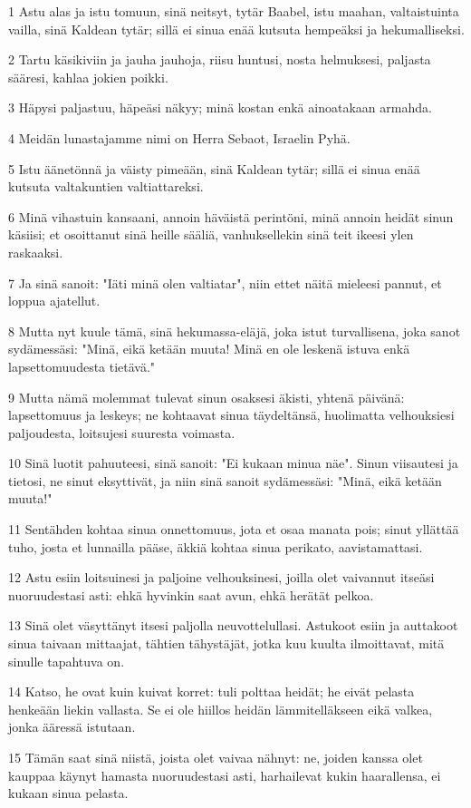 \par 1 Astu alas ja istu tomuun, sinä neitsyt, tytär Baabel, istu maahan, valtaistuinta vailla, sinä Kaldean tytär; sillä ei sinua enää kutsuta hempeäksi ja hekumalliseksi.
\par 2 Tartu käsikiviin ja jauha jauhoja, riisu huntusi, nosta helmuksesi, paljasta sääresi, kahlaa jokien poikki.
\par 3 Häpysi paljastuu, häpeäsi näkyy; minä kostan enkä ainoatakaan armahda.
\par 4 Meidän lunastajamme nimi on Herra Sebaot, Israelin Pyhä.
\par 5 Istu äänetönnä ja väisty pimeään, sinä Kaldean tytär; sillä ei sinua enää kutsuta valtakuntien valtiattareksi.
\par 6 Minä vihastuin kansaani, annoin häväistä perintöni, minä annoin heidät sinun käsiisi; et osoittanut sinä heille sääliä, vanhuksellekin sinä teit ikeesi ylen raskaaksi.
\par 7 Ja sinä sanoit: "Iäti minä olen valtiatar", niin ettet näitä mieleesi pannut, et loppua ajatellut.
\par 8 Mutta nyt kuule tämä, sinä hekumassa-eläjä, joka istut turvallisena, joka sanot sydämessäsi: "Minä, eikä ketään muuta! Minä en ole leskenä istuva enkä lapsettomuudesta tietävä."
\par 9 Mutta nämä molemmat tulevat sinun osaksesi äkisti, yhtenä päivänä: lapsettomuus ja leskeys; ne kohtaavat sinua täydeltänsä, huolimatta velhouksiesi paljoudesta, loitsujesi suuresta voimasta.
\par 10 Sinä luotit pahuuteesi, sinä sanoit: "Ei kukaan minua näe". Sinun viisautesi ja tietosi, ne sinut eksyttivät, ja niin sinä sanoit sydämessäsi: "Minä, eikä ketään muuta!"
\par 11 Sentähden kohtaa sinua onnettomuus, jota et osaa manata pois; sinut yllättää tuho, josta et lunnailla pääse, äkkiä kohtaa sinua perikato, aavistamattasi.
\par 12 Astu esiin loitsuinesi ja paljoine velhouksinesi, joilla olet vaivannut itseäsi nuoruudestasi asti: ehkä hyvinkin saat avun, ehkä herätät pelkoa.
\par 13 Sinä olet väsyttänyt itsesi paljolla neuvottelullasi. Astukoot esiin ja auttakoot sinua taivaan mittaajat, tähtien tähystäjät, jotka kuu kuulta ilmoittavat, mitä sinulle tapahtuva on.
\par 14 Katso, he ovat kuin kuivat korret: tuli polttaa heidät; he eivät pelasta henkeään liekin vallasta. Se ei ole hiillos heidän lämmitelläkseen eikä valkea, jonka ääressä istutaan.
\par 15 Tämän saat sinä niistä, joista olet vaivaa nähnyt: ne, joiden kanssa olet kauppaa käynyt hamasta nuoruudestasi asti, harhailevat kukin haarallensa, ei kukaan sinua pelasta.

